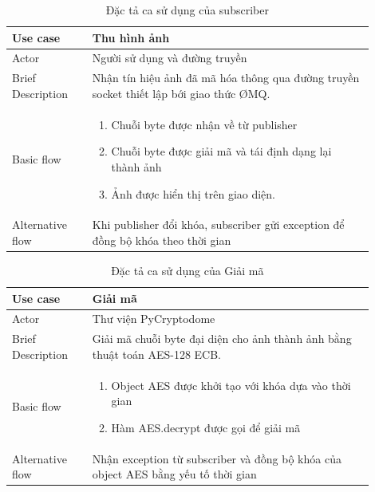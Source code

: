 \documentclass{article}
\begin{document}
\begin{table}[H]
    \centering
    \begin{tabular}{|p{0.2\linewidth}|p{0.7\linewidth}|}
    \hline
        Use case & Thu hình ảnh \\
        \hline
        Actor & Người sử dụng và đường truyền \\ 
        \hline
        Brief Description & Nhận tín hiệu ảnh đã mã hóa thông qua đường truyền socket thiết lập bới giao thức \O MQ.\\
        \hline
        Basic flow & \begin{enumerate}
            \item Chuỗi byte được nhận về từ publisher
            \item Chuỗi byte được giải mã và tái định dạng lại thành ảnh
            \item Ảnh được hiển thị trên giao diện.
        \end{enumerate} \\
        \hline
        Alternative flow &  Khi publisher đổi khóa, subscriber gửi exception để đồng bộ khóa theo thời gian \\
        \hline
    \end{tabular}
    \caption{Đặc tả ca sử dụng của subscriber}
    \label{table3}
\end{table}

\begin{table}[H]
    \centering
    \begin{tabular}{|p{0.2\linewidth}|p{0.7\linewidth}|}
    \hline
        Use case & Giải mã \\
        \hline
        Actor & Thư viện PyCryptodome \\ 
        \hline
        Brief Description & Giải mã chuỗi byte đại diện cho ảnh thành ảnh bằng thuật toán AES-128 ECB.\\
        \hline
        Basic flow & \begin{enumerate}
            \item Object AES được khởi tạo với khóa dựa vào thời gian
            \item Hàm AES.decrypt được gọi để giải mã
        \end{enumerate} \\
        \hline
        Alternative flow &  Nhận exception từ subscriber và đồng bộ khóa của object AES bằng yếu tố thời gian \\
        \hline
    \end{tabular}
    \caption{Đặc tả ca sử dụng của Giải mã}
    \label{decrypt}
\end{table}
\end{document}
